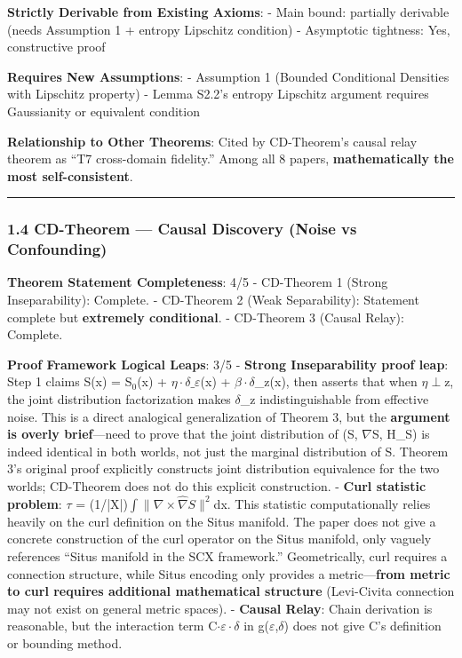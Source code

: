 \documentclass[
  12pt,
]{article}
\begin{document}
\textbf{Strictly Derivable from Existing Axioms}:
- Main bound: partially derivable (needs Assumption 1 + entropy Lipschitz condition)
- Asymptotic tightness: Yes, constructive proof

\textbf{Requires New Assumptions}:
- Assumption 1 (Bounded Conditional Densities with Lipschitz property)
- Lemma S2.2's entropy Lipschitz argument requires Gaussianity or equivalent condition

\textbf{Relationship to Other Theorems}: Cited by CD-Theorem's causal relay theorem as ``T7 cross-domain fidelity.'' Among all 8 papers, \textbf{mathematically the most self-consistent}.

\begin{center}\rule{0.5\linewidth}{0.5pt}\end{center}

\subsubsection{1.4 CD-Theorem --- Causal Discovery (Noise vs Confounding)}\label{cd-theorem}

\textbf{Theorem Statement Completeness}: 4/5
- CD-Theorem 1 (Strong Inseparability): Complete.
- CD-Theorem 2 (Weak Separability): Statement complete but \textbf{extremely conditional}.
- CD-Theorem 3 (Causal Relay): Complete.

\textbf{Proof Framework Logical Leaps}: 3/5
- \textbf{Strong Inseparability proof leap}: Step 1 claims S(x) = S$_0$(x) + $\eta\cdot\delta\_\varepsilon$(x) + $\beta\cdot\delta$\_z(x), then asserts that when $\eta\perp$z, the joint distribution factorization makes $\delta$\_z indistinguishable from effective noise. This is a direct analogical generalization of Theorem 3, but the \textbf{argument is overly brief}---need to prove that the joint distribution of (S, $\nabla$S, H\_S) is indeed identical in both worlds, not just the marginal distribution of S. Theorem 3's original proof explicitly constructs joint distribution equivalence for the two worlds; CD-Theorem does not do this explicit construction.
- \textbf{Curl statistic problem}: $\tau$ = (1/|X|)$\int\|\nabla\times\hat{\nabla}S\|^2$dx. This statistic computationally relies heavily on the curl definition on the Situs manifold. The paper does not give a concrete construction of the curl operator on the Situs manifold, only vaguely references ``Situs manifold in the SCX framework.'' Geometrically, curl requires a connection structure, while Situs encoding only provides a metric---\textbf{from metric to curl requires additional mathematical structure} (Levi-Civita connection may not exist on general metric spaces).
- \textbf{Causal Relay}: Chain derivation is reasonable, but the interaction term C$\cdot\varepsilon\cdot\delta$ in g($\varepsilon$,$\delta$) does not give C's definition or bounding method.
\end{document}
